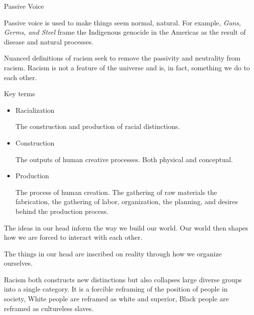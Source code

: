 \documentclass{report}
\begin{document}
\begin{description}
    \item Passive Voice

        Passive voice is used to make things seem normal, natural.
        For example, \textit{Guns, Germs, and Steel} frame the Indigenous
        genocide in the Americas as the result of disease and natural processes.

        Nuanced definitions of racism seek to remove the passivity and neutrality
        from racism. Racism is not a feature of the universe and is, in fact, something
        we do to each other.
    
    \item  Key terms
        \begin{itemize}
            \item Racialization

                The construction and production of racial distinctions.
            \item Construction

                The outputs of human creative processes. Both physical and
                conceptual.
            \item Production

                The process of human creation. The gathering of raw materials
                the fabrication, the gathering of labor, organization, the
                planning, and desires behind the production process.
        \end{itemize}

        \begin{center}
            \begin{mdframed}
                The ideas in our head inform the way we build our world.
                Our world then shapes how we are forced to interact with
                each other.

                The things in our head are inscribed on reality through how
                we organize ourselves.
            \end{mdframed}
        \end{center}

        Racism both constructs new distinctions but also collapses large
        diverse groups into a single category. It is a forcible reframing
        of the position of people in society, White people are reframed
        as white and superior, Black people are reframed as cultureless
        slaves.

\end{description}
\end{document}

